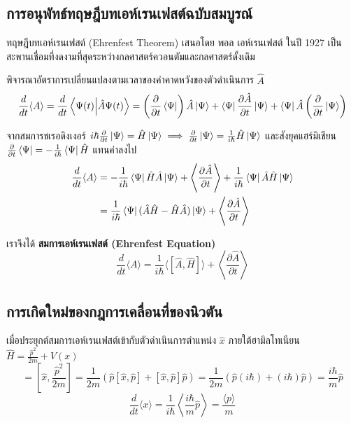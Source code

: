 \subsection{การอนุพัทธ์ทฤษฎีบทเอห์เรนเฟสต์ฉบับสมบูรณ์}
ทฤษฎีบทเอห์เรนเฟสต์ (Ehrenfest Theorem) เสนอโดย พอล เอห์เรนเฟสต์ ในปี 1927 เป็นสะพานเชื่อมที่งดงามที่สุดระหว่างกลศาสตร์ควอนตัมและกลศาสตร์ดั้งเดิม

พิจารณาอัตราการเปลี่ยนแปลงตามเวลาของค่าคาดหวังของตัวดำเนินการ $\hat{A}$
\begin{equation}
\frac{d}{dt}\langle A \rangle = \frac{d}{dt}\braket{\Psi(t)}{\hat{A}\Psi(t)} = \left(\frac{\partial}{\partial t}\bra{\Psi}\right) \hat{A} \ket{\Psi} + \bra{\Psi} \frac{\partial \hat{A}}{\partial t} \ket{\Psi} + \bra{\Psi} \hat{A} \left(\frac{\partial}{\partial t}\ket{\Psi}\right)
\end{equation}

จากสมการชเรอดิงเงอร์ $i\hbar \frac{\partial}{\partial t}\ket{\Psi} = \hat{H}\ket{\Psi} \implies \frac{\partial}{\partial t}\ket{\Psi} = \frac{1}{i\hbar}\hat{H}\ket{\Psi}$ และสังยุคแฮร์มิเชียน $\frac{\partial}{\partial t}\bra{\Psi} = -\frac{1}{i\hbar}\bra{\Psi}\hat{H}$ แทนค่าลงไป
\begin{align}
\frac{d}{dt}\langle A \rangle &= -\frac{1}{i\hbar}\bra{\Psi}\hat{H}\hat{A}\ket{\Psi} + \left\langle \frac{\partial \hat{A}}{\partial t} \right\rangle + \frac{1}{i\hbar}\bra{\Psi}\hat{A}\hat{H}\ket{\Psi} \nonumber \\
&= \frac{1}{i\hbar}\bra{\Psi} (\hat{A}\hat{H} - \hat{H}\hat{A}) \ket{\Psi} + \left\langle \frac{\partial \hat{A}}{\partial t} \right\rangle
\end{align}

เราจึงได้ \textbf{สมการเอห์เรนเฟสต์ (Ehrenfest Equation)}
\begin{equation}
\frac{d}{dt}\langle A \rangle = \frac{1}{i\hbar} \langle [\hat{A}, \hat{H}] \rangle + \left\langle \frac{\partial \hat{A}}{\partial t} \right\rangle
\label{eq:ehrenfest_master}
\end{equation}

\subsection{การเกิดใหม่ของกฎการเคลื่อนที่ของนิวตัน}
เมื่อประยุกต์สมการเอห์เรนเฟสต์เข้ากับตัวดำเนินการตำแหน่ง $\hat{x}$ ภายใต้ฮามิลโทเนียน $\hat{H} = \frac{\hat{p}^2}{2m} + V(x)$
\begin{equation}
[\hat{x}, \hat{H}] = \left[ \hat{x}, \frac{\hat{p}^2}{2m} \right] = \frac{1}{2m} (\hat{p}[\hat{x}, \hat{p}] + [\hat{x}, \hat{p}]\hat{p}) = \frac{1}{2m} (\hat{p}(i\hbar) + (i\hbar)\hat{p}) = \frac{i\hbar}{m}\hat{p}
\end{equation}
\begin{equation}
\frac{d}{dt}\langle x \rangle = \frac{1}{i\hbar} \left\langle \frac{i\hbar}{m}\hat{p} \right\rangle = \frac{\langle p \rangle}{m}
\label{eq:ehrenfest_x}
\end{equation}

